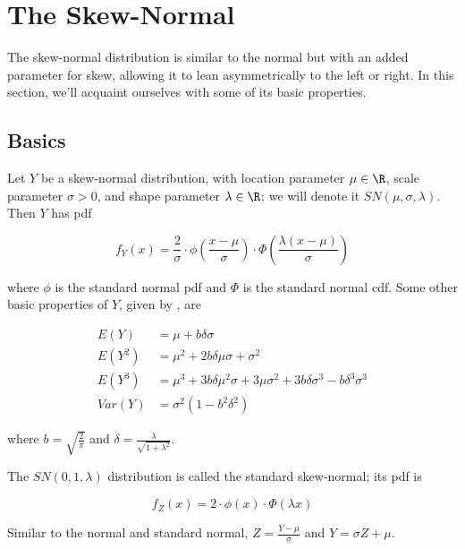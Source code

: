 \documentclass{article}
\begin{document}
\section{The Skew-Normal}

The skew-normal distribution is similar to the normal but with an added
parameter for skew, allowing it to lean asymmetrically to the left or right. In
this section, we'll acquaint ourselves with some of its basic properties.

\subsection{Basics}

Let $Y$ be a skew-normal distribution, with location parameter $\mu \in \R$,
scale parameter $\sigma > 0$, and shape parameter $\lambda \in \R$; we will
denote it $SN(\mu, \sigma, \lambda)$. Then $Y$ has pdf

\begin{equation} \label{eq:sn-pdf}
  f_Y(x) = \frac2\sigma \cdot \phi \left( \frac{x-\mu}{\sigma} \right) \cdot \Phi \left( \frac{\lambda(x-\mu)}{\sigma} \right)
\end{equation}

where $\phi$ is the standard normal pdf and $\Phi$ is the standard normal cdf.
Some other basic properties of $Y$, given by \citet{pewsey}, are

\begin{align}
  E(Y) &= \mu + b \delta \sigma \nonumber \\
  E(Y^2) &= \mu^2 + 2b \delta \mu \sigma + \sigma^2 \label{eq:sn-basic-properties} \\
  E(Y^3) &= \mu^3 + 3 b \delta \mu^2 \sigma + 3 \mu \sigma^2 + 3 b \delta \sigma^3 - b \delta^3 \sigma^3 \nonumber \\
  Var(Y) &= \sigma^2 (1 - b^2 \delta^2) \nonumber
\end{align}

where $b = \sqrt{\frac{2}{\pi}}$ and $\delta = \frac{\lambda}{\sqrt{1 +
\lambda^2}}$.

The $SN(0,1,\lambda)$ distribution is called the standard skew-normal; its pdf
is

\begin{equation} \label{eq:standard-sn-pdf}
  f_Z(x) = 2 \cdot \phi(x) \cdot \Phi (\lambda x)
\end{equation}

Similar to the normal and standard normal, $Z = \frac{Y - \mu}{\sigma}$ and $Y
= \sigma Z + \mu$.
\end{document}
